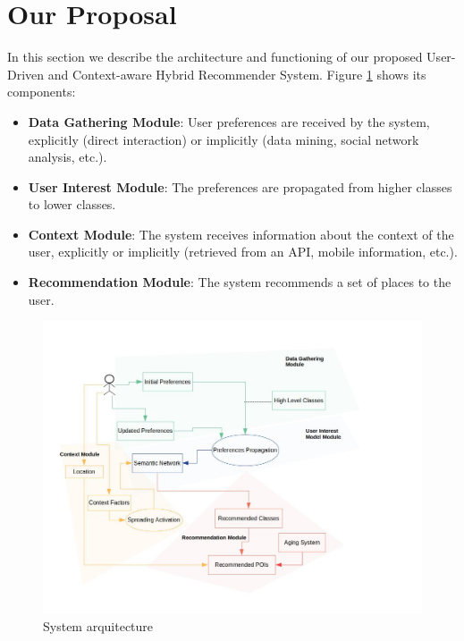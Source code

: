 \section{Our Proposal}
\label{sec:proposal}

In this section we describe the architecture and functioning of our proposed User-Driven and Context-aware Hybrid Recommender System. Figure \ref{fig:arquitecture} shows its components:
\begin{itemize}
    \item \textbf{Data Gathering Module}: User preferences are received by the system, explicitly (direct interaction) or implicitly (data mining, social network analysis, etc.).
    \item \textbf{User Interest Module}: The preferences are propagated from higher classes to lower classes.
    \item \textbf{Context Module}: The system receives information about the context of the user, explicitly or implicitly (retrieved from an API, mobile information, etc.).
    \item \textbf{Recommendation Module}: The system recommends a set of places to the user.
\end{itemize}

\begin{figure}[h]
\centering
\includegraphics[scale=0.4]{draws/arquitecture.jpg}
\caption{System arquitecture}
\label{fig:arquitecture}
\end{figure}

